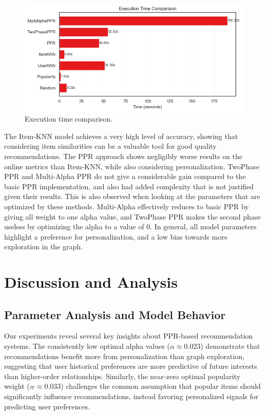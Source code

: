 \documentclass[conference,compsoc]{IEEEtran}
\begin{document}
\begin{figure}[!ht]
    \centering
    \includegraphics[width=\linewidth]{images/execution_time_comparison.png}
    \caption{Execution time comparison.}
        \label{fig:execution_time_comparison}
\end{figure}

The Item-KNN model achieves a very high level of accuracy, showing that considering item similarities can be a valuable tool for good quality recommendations. The PPR approach shows negligibly worse results on the online metrics than Item-KNN, while also considering personalization. TwoPhase PPR and Multi-Alpha PPR do not give a considerable gain compared to the basic PPR implementation, and also had added complexity that is not justified given their results. This is also observed when looking at the parameters that are optimized by these methods. Multi-Alpha effectively reduces to basic PPR by giving all weight to one alpha value, and TwoPhase PPR makes the second phase useless by optimizing the alpha to a value of 0. In general, all model parameters highlight a preference for personalization, and a low bias towards more exploration in the graph.

\section{Discussion and Analysis}
\subsection{Parameter Analysis and Model Behavior}
Our experiments reveal several key insights about PPR-based recommendation systems. The consistently low optimal alpha values ($\alpha \approx 0.023$) demonstrate that recommendations benefit more from personalization than graph exploration, suggesting that user historical preferences are more predictive of future interests than higher-order relationships. Similarly, the near-zero optimal popularity weight ($w \approx 0.033$) challenges the common assumption that popular items should significantly influence recommendations, instead favoring personalized signals for predicting user preferences.
\end{document}
